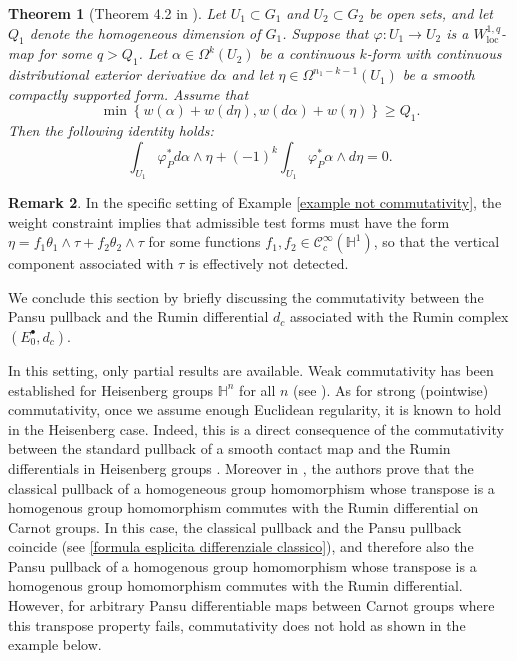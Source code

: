 \documentclass[dvipsnames]{amsart}
\newtheorem{theorem}{Theorem}[section]
\theoremstyle{definition}
\newtheorem{remark}[theorem]{Remark}
\theoremstyle{definition}
\numberwithin{equation}{section}
\begin{document}
\begin{theorem}[Theorem 4.2 in \cite{kleiner2020pansu}]\label{theorem KMX}
    Let $U_1 \subset G_1$ and $U_2 \subset G_2$ be open sets, and let $Q_1$ denote the homogeneous dimension of $G_1$. Suppose that $\varphi : U_1 \rightarrow U_2$ is a $W_{\text{loc}}^{1,q}$-map for some $q>Q_1$. Let $\alpha \in \Omega^k(U_2)$ be a continuous $k$-form with continuous distributional exterior derivative $d\alpha$ and let $\eta \in \Omega^{n_1 - k -1}(U_1)$ be a smooth compactly supported form. Assume that
    \begin{equation}\label{condizione pesi KMX}
       \min \left\{ w(\alpha) + w(d\eta), w(d\alpha) + w(\eta) \right\} \geq Q_1.
    \end{equation}
    Then the following identity holds:
    \begin{equation}
        \int_{U_1} \varphi^*_P d\alpha \wedge \eta + (-1)^{k} \int_{U_1}\varphi^*_P\alpha \wedge d\eta = 0.
    \end{equation}
\end{theorem}

\begin{remark}
    In the specific setting of Example \ref{example not commutativity}, the weight constraint implies that admissible test forms must have the form $\eta = f_1 \theta_1 \wedge \tau + f_2 \theta_2 \wedge \tau$ for some functions $f_1, f_2 \in \mathcal{C}^{\infty}_c(\mathbb{H}^1)$, so that the vertical component associated with $\tau$ is effectively not detected.
\end{remark}




 

\medskip
We conclude this section by briefly discussing the commutativity between the Pansu pullback and the Rumin differential $d_c$ associated with the Rumin complex $(E_0^\bullet,d_c)$.

In this setting, only partial results are available. Weak commutativity has been established for Heisenberg groups $\mathbb H^n$ for all $n$ (see \cite{kleiner2021sobolevmappingsrumincomplex}). As for strong (pointwise) commutativity, once we assume enough Euclidean regularity, it is known to hold in the Heisenberg case. Indeed, this is a direct consequence of the commutativity between the standard pullback of a smooth contact map and the Rumin differentials in Heisenberg groups \cite{canarecci2019insightrumincohomologyorientability}. Moreover in \cite[Theorem 3.16]{FranchiTesi}, the authors prove that the classical pullback of a homogeneous group homomorphism whose transpose is a homogenous group homomorphism commutes with the Rumin differential on Carnot groups. In this case, the classical pullback and the Pansu pullback coincide (see \eqref{formula esplicita differenziale classico}), and therefore also the Pansu pullback of a homogenous group homomorphism whose transpose is a homogenous group homomorphism commutes with the Rumin differential. However, for arbitrary Pansu differentiable maps between Carnot groups where this transpose property fails, commutativity does not hold as shown in the example below.
\end{document}
